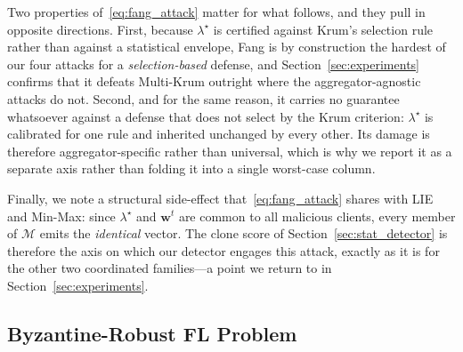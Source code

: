 \documentclass[journal]{IEEEtran}
\begin{document}
Two properties of~\eqref{eq:fang_attack} matter for what follows, and they pull in opposite directions. First, because $\lambda^\star$ is certified against Krum's selection rule rather than against a statistical envelope, Fang is by construction the hardest of our four attacks for a \emph{selection-based} defense, and Section~\ref{sec:experiments} confirms that it defeats Multi-Krum outright where the aggregator-agnostic attacks do not. Second, and for the same reason, it carries no guarantee whatsoever against a defense that does not select by the Krum criterion: $\lambda^\star$ is calibrated for one rule and inherited unchanged by every other. Its damage is therefore aggregator-specific rather than universal, which is why we report it as a separate axis rather than folding it into a single worst-case column.

Finally, we note a structural side-effect that~\eqref{eq:fang_attack} shares with LIE and Min-Max: since $\lambda^\star$ and $\mathbf{w}^t$ are common to all malicious clients, every member of $\mathcal{M}$ emits the \emph{identical} vector. The clone score of Section~\ref{sec:stat_detector} is therefore the axis on which our detector engages this attack, exactly as it is for the other two coordinated families---a point we return to in Section~\ref{sec:experiments}.

\subsection{Byzantine-Robust FL Problem}
\label{sec:p1}
\end{document}
